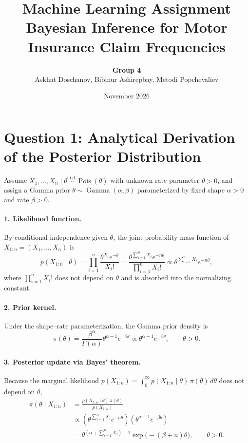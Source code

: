 \documentclass[11pt,a4paper]{article}
\title{\textbf{Machine Learning Assignment}\\
\large Bayesian Inference for Motor Insurance Claim Frequencies}
\author{\textbf{Group 4}\\
Askhat Doschanov, Bibinur Ashirepbay, Metodi Popchevaliev}
\date{November 2026}
\begin{document}
\maketitle

\section*{Question 1: Analytical Derivation of the Posterior Distribution}

Assume $X_1, \dots, X_n \mid \theta \stackrel{\text{i.i.d.}}{\sim} \operatorname{Pois}(\theta)$ with unknown rate parameter $\theta > 0$, and assign a Gamma prior $\theta \sim \operatorname{Gamma}(\alpha, \beta)$ parameterized by fixed shape $\alpha > 0$ and rate $\beta > 0$.

\paragraph{1. Likelihood function.}
By conditional independence given $\theta$, the joint probability mass function of $X_{1:n} = (X_1, \dots, X_n)$ is
\[
p(X_{1:n} \mid \theta)
= \prod_{i=1}^{n} \frac{\theta^{X_i} e^{-\theta}}{X_i!}
= \frac{\theta^{\sum_{i=1}^{n} X_i} e^{-n\theta}}{\prod_{i=1}^{n} X_i!}
\propto \theta^{\sum_{i=1}^{n} X_i} e^{-n\theta},
\]
where $\prod_{i=1}^{n} X_i!$ does not depend on $\theta$ and is absorbed into the normalizing constant.

\paragraph{2. Prior kernel.}
Under the shape--rate parameterization, the Gamma prior density is
\[
\pi(\theta)
= \frac{\beta^\alpha}{\Gamma(\alpha)} \theta^{\alpha - 1} e^{-\beta\theta}
\propto \theta^{\alpha - 1} e^{-\beta\theta}, \qquad \theta > 0.
\]

\paragraph{3. Posterior update via Bayes' theorem.}
Because the marginal likelihood $p(X_{1:n}) = \int_0^\infty p(X_{1:n} \mid \theta)\,\pi(\theta)\,d\theta$ does not depend on $\theta$,
\begin{align*}
\pi(\theta \mid X_{1:n})
&= \frac{p(X_{1:n} \mid \theta)\,\pi(\theta)}{p(X_{1:n})} \\
&\propto \left(\theta^{\sum_{i=1}^{n} X_i} e^{-n\theta}\right)\left(\theta^{\alpha - 1} e^{-\beta\theta}\right) \\
&= \theta^{\left(\alpha + \sum_{i=1}^{n} X_i\right) - 1} \exp\!\bigl(-(\beta + n)\theta\bigr), \qquad \theta > 0.
\end{align*}
\end{document}
